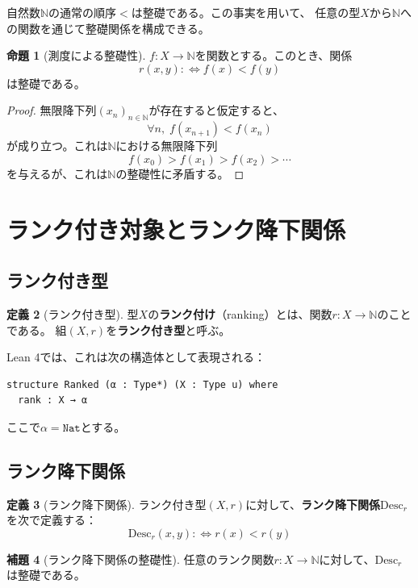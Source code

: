 \documentclass[11pt,a4paper]{ltjsarticle}
\theoremstyle{definition}
\newtheorem{definition}{定義}[section]
\newtheorem{lemma}[definition]{補題}
\newtheorem{proposition}[definition]{命題}
\begin{document}
自然数$\mathbb{N}$の通常の順序$<$は整礎である。この事実を用いて、
任意の型$X$から$\mathbb{N}$への関数を通じて整礎関係を構成できる。

\begin{proposition}[測度による整礎性]
\label{prop:measure-wf}
$f: X \to \mathbb{N}$を関数とする。このとき、関係
\[
r(x,y) :\!\!\iff f(x) < f(y)
\]
は整礎である。
\end{proposition}

\begin{proof}
無限降下列$(x_n)_{n \in \mathbb{N}}$が存在すると仮定すると、
\[
\forall n,\; f(x_{n+1}) < f(x_n)
\]
が成り立つ。これは$\mathbb{N}$における無限降下列
\[
f(x_0) > f(x_1) > f(x_2) > \cdots
\]
を与えるが、これは$\mathbb{N}$の整礎性に矛盾する。
\end{proof}

\section{ランク付き対象とランク降下関係}
\label{sec:ranked-objects}

\subsection{ランク付き型}

\begin{definition}[ランク付き型]
\label{def:ranked}
型$X$の\textbf{ランク付け}（ranking）とは、関数$r: X \to \mathbb{N}$のことである。
組$(X, r)$を\textbf{ランク付き型}と呼ぶ。

Lean 4では、これは次の構造体として表現される：
\begin{verbatim}
structure Ranked (α : Type*) (X : Type u) where
  rank : X → α
\end{verbatim}
ここで$\alpha = \mathtt{Nat}$とする。
\end{definition}

\subsection{ランク降下関係}

\begin{definition}[ランク降下関係]
\label{def:desc}
ランク付き型$(X, r)$に対して、\textbf{ランク降下関係}$\mathrm{Desc}_r$を次で定義する：
\[
\mathrm{Desc}_r(x, y) :\!\!\iff r(x) < r(y)
\]
\end{definition}

\begin{lemma}[ランク降下関係の整礎性]
\label{lem:wf-desc}
任意のランク関数$r: X \to \mathbb{N}$に対して、$\mathrm{Desc}_r$は整礎である。
\end{lemma}
\end{document}
